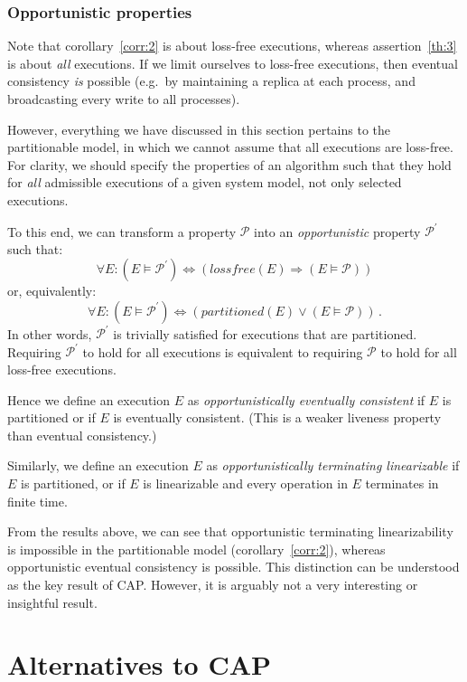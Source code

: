 \documentclass[a4paper,twocolumn,10pt]{article}
\begin{document}
\subsubsection{Opportunistic properties}

Note that corollary~\ref{corr:2} is about loss-free executions, whereas assertion~\ref{th:3} is
about \emph{all} executions. If we limit ourselves to loss-free executions, then eventual
consistency \emph{is} possible (e.g.\ by maintaining a replica at each process, and broadcasting
every write to all processes).

However, everything we have discussed in this section pertains to the partitionable model, in which
we cannot assume that all executions are loss-free. For clarity, we should specify the properties of
an algorithm such that they hold for \emph{all} admissible executions of a given system model, not
only selected executions.

To this end, we can transform a property $\mathcal{P}$ into an \emph{opportunistic} property
$\mathcal{P}^\prime$ such that:
$$\forall E \mathbin{:} (E \models \mathcal{P}^\prime) \Leftrightarrow (\mathit{lossfree}(E) \Rightarrow (E \models \mathcal{P}))$$
or, equivalently:
$$\forall E \mathbin{:} (E \models \mathcal{P}^\prime) \Leftrightarrow (\mathit{partitioned}(E) \vee (E \models \mathcal{P}))\,.$$
In other words, $\mathcal{P}^\prime$ is trivially satisfied for executions that are partitioned.
Requiring $\mathcal{P}^\prime$ to hold for all executions is equivalent to requiring $\mathcal{P}$
to hold for all loss-free executions.

Hence we define an execution $E$ as \emph{opportunistically eventually consistent} if $E$ is
partitioned or if $E$ is eventually consistent. (This is a weaker liveness property than eventual
consistency.)

Similarly, we define an execution $E$ as \emph{opportunistically terminating linearizable} if $E$ is
partitioned, or if $E$ is linearizable and every operation in $E$ terminates in finite time.

From the results above, we can see that opportunistic terminating linearizability is impossible in
the partitionable model (corollary~\ref{corr:2}), whereas opportunistic eventual consistency is
possible. This distinction can be understood as the key result of CAP. However, it is arguably not a
very interesting or insightful result.

\section{Alternatives to CAP}\label{sec:alternatives}
\end{document}
